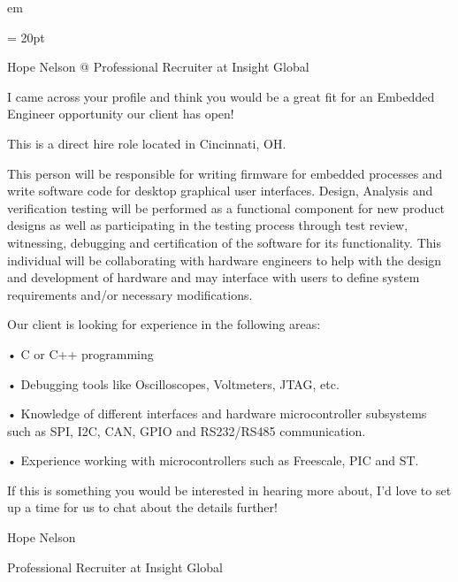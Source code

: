 

 em

\FFrj \baselineskip = 20pt



\centerline{
Hope Nelson @ Professional Recruiter at Insight Global
} 

\par I came across your profile and think you would be a great fit for an Embedded Engineer opportunity our client has open!
\par This is a direct hire role located in Cincinnati, OH.
\par This person will be responsible for writing firmware for embedded processes and write software code for desktop graphical user interfaces. Design, Analysis and verification testing will be performed as a functional component for new product designs as well as participating in the testing process through test review, witnessing, debugging and certification of the software for its functionality. This individual will be collaborating with hardware engineers to help with the design and development of hardware and may interface with users to define system requirements and/or necessary modifications.
\par Our client is looking for experience in the following areas:
\par • C or C++ programming
\par • Debugging tools like Oscilloscopes, Voltmeters, JTAG, etc.
\par • Knowledge of different interfaces and hardware microcontroller subsystems such as SPI, I2C, CAN, GPIO and RS232/RS485 communication.
\par • Experience working with microcontrollers such as Freescale, PIC and ST.
\par If this is something you would be interested in hearing more about, I'd love to set up a time for us to chat about the details further!
\par Hope Nelson
\par Professional Recruiter at Insight Global

\bye

